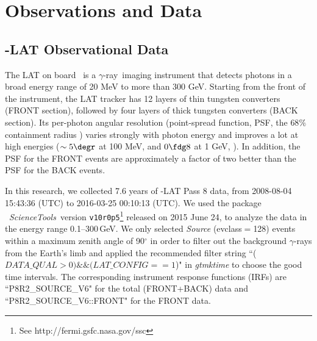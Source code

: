 \documentclass[12pt,preprint]{aastex}
\newcommand{\gray}{{\rm $\gamma$-ray}}
\begin{document}
\section{Observations and Data}
\label{sec:ob}


\subsection{\Fermi-LAT Observational Data}
The LAT on board \Fermi\ is a \gray\ imaging instrument 
that detects photons in a broad energy range of 
20 MeV to more than 300 GeV.
Starting from the front of the instrument,
the LAT tracker has 12 layers of thin tungsten converters
(FRONT section), followed by four layers of thick tungsten converters
(BACK section).
Its per-photon angular resolution (point-spread function, PSF,
the $68\%$ containment radius ) varies  strongly with photon energy and 
improves a lot at high energies ($\sim5\degr$ at 100 MeV,
and $0\fdg8$ at 1 GeV, \citealt{Atwood2009fermilat}). 
In addition, the PSF for the FRONT events are approximately a 
factor of two better than the PSF for the BACK events.

In this research, we collected 7.6 years of \Fermi-LAT Pass 8 data, 
from 2008-08-04 15:43:36 (UTC) to 2016-03-25 00:10:13 (UTC). 
We used the package \Fermi\ \emph{ScienceTools}~version {\tt v10r0p5}\footnote{See http://fermi.gsfc.nasa.gov/ssc} released on 2015 June 24, 
to analyze the data in the energy range 0.1--300\,GeV.
We only selected  \emph{Source} (evclass$=$128) events within 
a maximum zenith angle of 90$^{\circ}$ in order to filter out 
the background \gray{s} from the Earth's limb and applied the 
recommended filter string 
``($DATA\_QUAL>0) \&\& (LAT\_CONFIG==1$)" 
in \textit{gtmktime} to choose the good time intervals.
The corresponding instrument response functions (IRFs) 
are ``P8R2\_SOURCE\_V6" for the total (FRONT+BACK) data and 
``P8R2\_SOURCE\_V6::FRONT" for the FRONT data.
 
\end{document}
